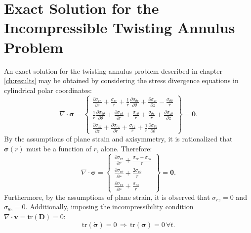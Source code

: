 \chapter{Exact Solution for the Incompressible Twisting Annulus Problem}

An exact solution for the twisting annulus problem described in chapter \ref{ch:results} may be obtained by considering the stress divergence equations in cylindrical polar coordinates:
\begin{equation}
  \nabla \cdot \boldsymbol{\sigma} = \left\{ \begin{array}{c} \frac{\partial \sigma_{rr}}{\partial r} + \frac{\sigma_{rr}}{r} + \frac{1}{r} \frac{\partial \sigma_{\theta r}}{\partial \theta} + \frac{\partial \sigma_{z r}}{\partial z} - \frac{\sigma_{\theta \theta}}{r} \\
    \frac{1}{r} \frac{\partial \sigma_{\theta \theta}}{\partial \theta} + \frac{\partial \sigma_{r\theta}}{\partial r} + \frac{\sigma_{r\theta}}{r} + \frac{\sigma_{\theta r}}{r} + \frac{\partial \sigma_{z \theta}}{\partial z} \\
    \frac{\partial \sigma_{z z}}{\partial z} + \frac{\partial \sigma_{r z}}{\partial r} + \frac{\sigma_{r z}}{r} + \frac{1}{r} \frac{\partial \sigma_{\theta z}}{\partial \theta} \end{array} \right\} = \mathbf{0}.
\end{equation}
By the assumptions of plane strain and axisymmetry, it is rationalized that $\boldsymbol{\sigma} (r)$ must be a function of $r$, alone. Therefore:
\begin{equation}
  \nabla \cdot \boldsymbol{\sigma} = \left\{ \begin{array}{c} \frac{\partial \sigma_{rr}}{\partial r} + \frac{\sigma_{rr} - \sigma_{\theta \theta}}{r} \\
    \frac{\partial \sigma_{r\theta}}{\partial r} + \frac{2 \sigma_{r\theta}}{r} \\
    \frac{\partial \sigma_{r z}}{\partial r} + \frac{\sigma_{r z}}{r} \end{array} \right\} = \mathbf{0}.
\end{equation}
Furthermore, by the assumptions of plane strain, it is observed that $\sigma_{rz} = 0$ and $\sigma_{\theta z} = 0$. Additionally, imposing the incompressibility condition $\nabla \cdot \mathbf{v} = \text{tr} (\mathbf{D}) = 0$:
\begin{equation}
  \text{tr} (\dot{\boldsymbol{\sigma}}) = 0 \, \Rightarrow \, \text{tr} (\boldsymbol{\sigma}) = 0 \, \forall t.
\end{equation}
